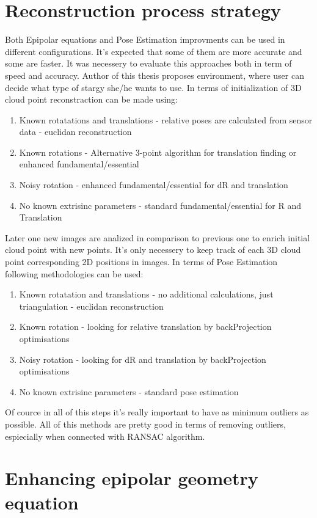 \section{Reconstruction process strategy}
Both Epipolar equations and Pose Estimation improvments can be used in different configurations. It's expected that some of them are more accurate and some are faster. It was necessery to evaluate this approaches both in term of speed and accuracy.   Author of this thesis proposes environment, where user can decide what type of stargy she/he wants to use. In terms of initialization of 3D cloud point reconstraction can be made using: 
\begin{enumerate}
\item Known rotatations and translations - relative poses are calculated from sensor data - euclidan reconstruction
\item Known rotations - Alternative 3-point algorithm for translation finding or enhanced fundamental/essential
\item Noisy rotation - enhanced fundamental/essential for dR and translation
\item No known extrisinc parameters - standard fundamental/essential for R and Translation
\end{enumerate}
Later one new images are analized in comparison to previous one to enrich initial cloud point with new points. It's only necessery to keep track of each 3D cloud point corresponding 2D positions in images. In terms of Pose Estimation following methodologies can be used:
\begin{enumerate}
\item Known rotatation and translations - no additional calculations, just triangulation - euclidan reconstruction
\item Known rotation - looking for relative translation by backProjection optimisations
\item Noisy rotation - looking for dR and translation by backProjection optimisations
\item No known extrisinc parameters - standard pose estimation
\end{enumerate}
Of cource in all of this steps it's really important to have as minimum outliers as possible. All of this methods are pretty good in terms of removing outliers, espiecially when connected with RANSAC algorithm.

\section{Enhancing epipolar geometry equation}
